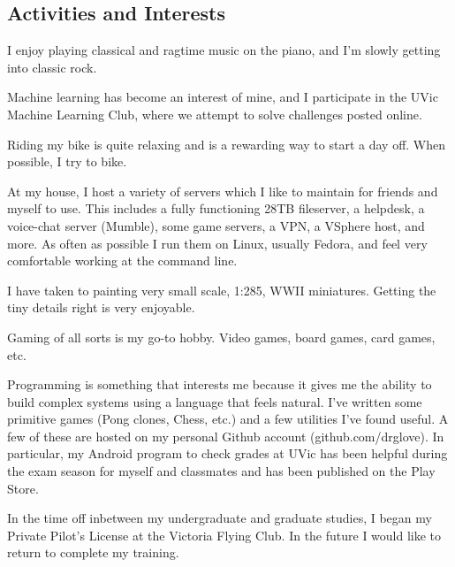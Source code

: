 \documentclass[margin,line]{resume}
\begin{document}
\begin{resume}
    \section{\mysidestyle Activities and Interests}
    \begin{list2}
    \item I enjoy playing classical and ragtime music on the piano, and I'm slowly getting into classic rock.
    \item Machine learning has become an interest of mine, and I participate in the UVic Machine Learning Club, where we attempt to solve challenges posted online.
    \item Riding my bike is quite relaxing and is a rewarding way to start a day off. When possible, I try to bike.
    \item At my house, I host a variety of servers which I like to maintain for friends and myself to use.
            This includes a fully functioning 28TB fileserver, a helpdesk, a voice-chat server (Mumble), some game servers, a VPN, a VSphere host, and more.
            As often as possible I run them on Linux, usually Fedora, and feel very comfortable working at the command line. 
    \item I have taken to painting very small scale, 1:285, WWII miniatures. Getting the tiny details right is very enjoyable.
    \item Gaming of all sorts is my go-to hobby. Video games, board games, card games, etc.
    \item Programming is something that interests me because it gives me the ability to build complex systems using a language that feels natural.
            I've written some primitive games (Pong clones, Chess, etc.) and a few utilities I've found useful.
            A few of these are hosted on my personal Github account (github.com/drglove).
            In particular, my Android program to check grades at UVic has been helpful during the exam season for myself and classmates and has been published on the Play Store.
    \item In the time off inbetween my undergraduate and graduate studies, I began my Private Pilot's License at the Victoria Flying Club. In the future I would like to return to complete my training.
    \end{list2}
    \vspace{2mm}


\end{resume}
\end{document}

